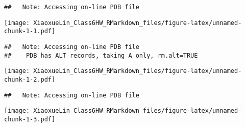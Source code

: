 \documentclass[]{article}
\begin{document}
\begin{verbatim}
##   Note: Accessing on-line PDB file
\end{verbatim}

\texttt{[image: XiaoxueLin\_Class6HW\_RMarkdown\_files/figure-latex/unnamed-chunk-1-1.pdf]}

\begin{verbatim}
##   Note: Accessing on-line PDB file
##    PDB has ALT records, taking A only, rm.alt=TRUE
\end{verbatim}

\texttt{[image: XiaoxueLin\_Class6HW\_RMarkdown\_files/figure-latex/unnamed-chunk-1-2.pdf]}

\begin{verbatim}
##   Note: Accessing on-line PDB file
\end{verbatim}

\texttt{[image: XiaoxueLin\_Class6HW\_RMarkdown\_files/figure-latex/unnamed-chunk-1-3.pdf]}
\end{document}
